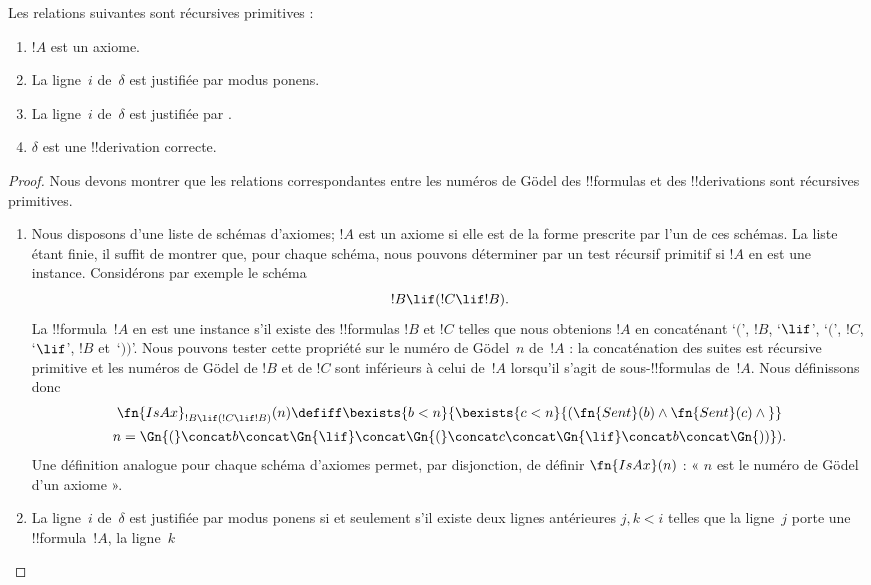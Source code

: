 \documentclass[../../../include/open-logic-section]{subfiles}
\begin{document}
\begin{prop}
Les relations suivantes sont récursives primitives :
\begin{enumerate}
\item $!A$ est un axiome.
\item La ligne~$i$ de~$\delta$ est justifiée par modus ponens.
\item La ligne~$i$ de~$\delta$ est justifiée par \QR.
\item $\delta$ est une !!{derivation} correcte.
\end{enumerate}
\end{prop}

\begin{proof}
Nous devons montrer que les relations correspondantes entre les
numéros de G\"odel des !!{formula}s et des !!{derivation}s sont
récursives primitives.
\begin{enumerate}
\item Nous disposons d'une liste de schémas d'axiomes; $!A$ est un
  axiome si elle est de la forme prescrite par l'un de ces schémas.
  La liste étant finie, il suffit de montrer que, pour chaque
  schéma, nous pouvons déterminer par un test récursif primitif si
  $!A$ en est une instance. Considérons par exemple le schéma
  \[
  !B \lif (!C \lif !B).
  \]
  La !!{formula}~$!A$ en est une instance s'il existe des
  !!{formula}s $!B$ et $!C$ telles que nous obtenions $!A$ en
  concaténant `$($', $!B$, `$\lif$', `$($', $!C$, `$\lif$',
  $!B$ et~`$))$'. Nous pouvons tester cette propriété sur le
  numéro de G\"odel~$n$ de~$!A$ : la concaténation des suites
  est récursive primitive et les numéros de G\"odel de $!B$ et
  de $!C$ sont inférieurs à celui de~$!A$ lorsqu'il s'agit de
  sous-!!{formula}s de~$!A$. Nous définissons donc
  \begin{multline*}
  \fn{IsAx}_{!B \lif (!C \lif !B)}(n) \defiff \bexists{b< n}{
    \bexists{c < n}{(\fn{Sent}(b) \land \fn{Sent}(c) \land {}}}\\ n =
  \Gn{(} \concat b \concat \Gn{\lif} \concat \Gn{(} \concat c \concat
  \Gn{\lif} \concat b \concat \Gn{))}).
  \end{multline*}
  Une définition analogue pour chaque schéma d'axiomes permet,
  par disjonction, de définir $\fn{IsAx}(n)$ : « $n$ est le
  numéro de G\"odel d'un axiome ».
\item La ligne~$i$ de~$\delta$ est justifiée par modus ponens si
  et seulement s'il existe deux lignes antérieures $j,k<i$ telles
  que la ligne~$j$ porte une !!{formula}~$!A$, la ligne~$k$

\end{enumerate}
\end{proof}
\end{document}
